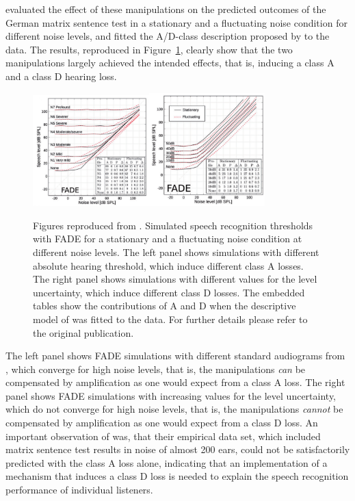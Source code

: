 \documentclass[10pt,a4paper,twocolumn]{article}
\begin{document}
\cite{kollmeier2016} evaluated the effect of these manipulations on the predicted outcomes of the German matrix sentence test in a stationary and a fluctuating noise condition for different noise levels, and fitted the A/D-class description proposed by \cite{plomp1978} to the data.
%
The results, reproduced in Figure~\ref{fig:2}, clearly show that the two manipulations largely achieved the intended effects, that is, inducing a class A and a class D hearing loss.
%
\begin{figure}
	\centerline{\includegraphics[width=0.4\textwidth]{images/kollmeier-FADE-A}\includegraphics[width=0.4\textwidth]{images/kollmeier-FADE-D}} 
	\caption{Figures reproduced from \cite{kollmeier2015}.
		Simulated speech recognition thresholds with FADE for a stationary and a fluctuating noise condition at different noise levels.
		The left panel shows simulations with different absolute hearing threshold, which induce different class A losses.
		The right panel shows simulations with different values for the level uncertainty, which induce different class D losses.
		The embedded tables show the contributions of A and D when the descriptive model of \cite{plomp1978} was fitted to the data.
		For further details please refer to the original publication.}
	\label{fig:2}
\end{figure}
%
The left panel shows FADE simulations with different standard audiograms from \cite{bisgaard2010}, which converge for high noise levels, that is, the manipulations \emph{can} be compensated by amplification as one would expect from a class A loss.
%
The right panel shows FADE simulations with increasing values for the level uncertainty, which do not converge for high noise levels, that is, the manipulations \emph{cannot} be compensated by amplification as one would expect from a class D loss.
%
An important observation of \cite{kollmeier2015} was, that their empirical data set, which included matrix sentence test results in noise of almost 200 ears, could not be satisfactorily predicted with the class A loss alone, indicating that an implementation of a mechanism that induces a class D loss is needed to explain the speech recognition performance of individual listeners.
\end{document}
